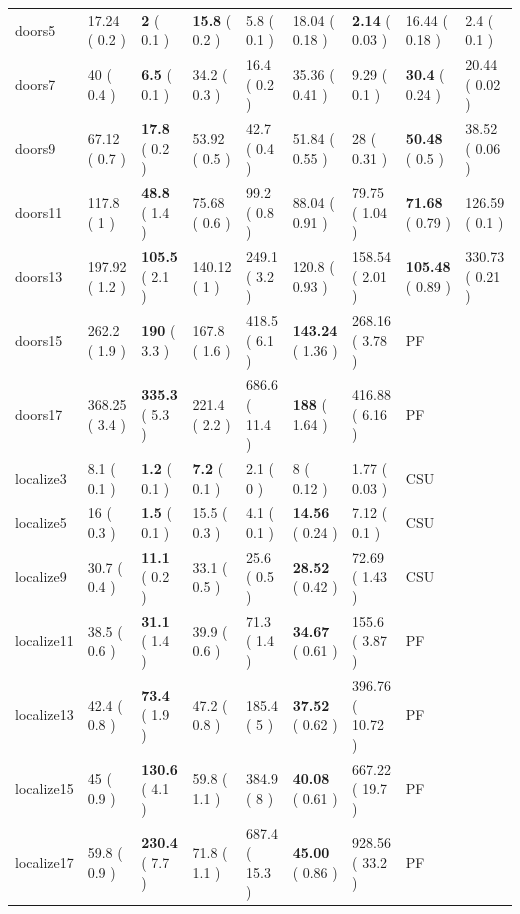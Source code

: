 \documentclass[letterpaper]{article}
\numberwithin{equation}{section}	%
\begin{document}
\begin{table}[htb]
\begin{tabular}{|l||l|l||l|l||l|l||l|l|}
doors5	&	17.24	(	0.2	)&	\textbf{2}	(	0.1	)&			\textbf{15.8}	(	0.2	)&	5.8	(	0.1	)&		18.04	(	0.18	)&	\textbf{2.14}	(	0.03	)&		 16.44	(	0.18	)&	2.4	 (	0.1	)\\
doors7	&	40	(	0.4	)&	\textbf{6.5}	(	0.1	)&			34.2	(	0.3	)&	16.4	(	0.2	)&		35.36	(	0.41	)&	9.29	(	0.1	)&		\textbf{30.4}	 (	0.24	)&	20.44	(	 0.02	)\\
doors9	&	67.12	(	0.7	)&	\textbf{17.8}	(	0.2	)&			53.92	(	0.5	)&	42.7	(	0.4	)&		51.84	(	0.55	)&	28	(	0.31	)&		 \textbf{50.48}	(	0.5	)&	38.52	(	 0.06	)\\
doors11	&	117.8	(	1	)&	\textbf{48.8}	(	1.4	)&			75.68	(	0.6	)&	99.2	(	0.8	)&		88.04	(	0.91	)&	79.75	(	1.04	)&		 \textbf{71.68}	(	0.79	)&	 126.59	(	0.1	)\\
doors13	&	197.92	(	1.2	)&	\textbf{105.5}	(	2.1	)&			140.12	(	1	)&	249.1	(	3.2	)&		120.8	(	0.93	)&	158.54	(	2.01	)&		 \textbf{105.48}	(	0.89	)&	 330.73	(	0.21	 )\\
doors15	&	262.2	(	1.9	)&	\textbf{190}	(	3.3	)&			167.8	(	1.6	)&	418.5	(	6.1	)&		\textbf{143.24}	(	1.36	)&	268.16	(	3.78	)&		 PF			&				 \\
doors17	&	368.25	(	3.4	)&	\textbf{335.3}	(	5.3	)&			221.4	(	2.2	)&	686.6	(	11.4	)&		\textbf{188}	(	1.64	)&	416.88	(	6.16	)&		 PF			&				 \\
\hline
																																					
localize3	&	8.1	(	0.1	)&	\textbf{1.2}	(	0.1	)&			\textbf{7.2}	(	0.1	)&	2.1	(	0	)&		8	(	0.12	)&	1.77	(	0.03	)&		CSU&	 \\						
localize5	&	16	(	0.3	)&	\textbf{1.5}	(	0.1	)&			15.5	(	0.3	)&	4.1	(	0.1	)&		\textbf{14.56}	(	0.24	)&	7.12	(	0.1	)&		CSU&	 \\						
localize9	&	30.7	(	0.4	)&	\textbf{11.1}	(	0.2	)&			33.1	(	0.5	)&	25.6	(	0.5	)&		\textbf{28.52}	(	0.42	)&	72.69	(	1.43	)&		 CSU&	\\						
localize11	&	38.5	(	0.6	)&	\textbf{31.1}	(	1.4	)&			39.9	(	0.6	)&	71.3	(	1.4	)&		\textbf{34.67}	(	0.61	)&	155.6	(	3.87	)&		 PF			&	\\			
localize13	&	42.4	(	0.8	)&	\textbf{73.4}	(	1.9	)&			47.2	(	0.8	)&	185.4	(	5	)&		\textbf{37.52}	(	0.62	)&	396.76	(	10.72	)&		 PF			&		\\		
localize15	&	45	(	0.9	)&	\textbf{130.6}	(	4.1	)&			59.8	(	1.1	)&	384.9	(	8	)&		\textbf{40.08}	(	0.61	)&	667.22	(	19.7	)&		 PF			&				 \\
localize17	&	59.8	(	0.9	)&	\textbf{230.4}	(	7.7	)&			71.8	(	1.1	)&	687.4	(	15.3	)&		\textbf{45.00}	(	0.86	)&	928.56	(	33.2	 )&		PF			&				 \\
\hline
																																					

\end{tabular}
\end{table}
\end{document}
